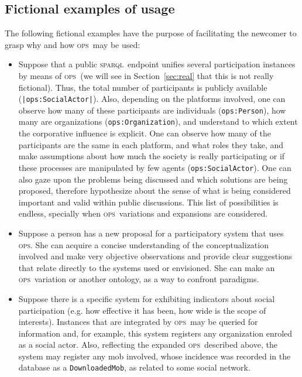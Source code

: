 \documentclass[10pt,letterpaper]{article}
\newcommand{\ops}{\textsc{ops}}
\newcommand{\sparql}{\textsc{sparql}}
\begin{document}
\subsection{Fictional examples of usage}\label{examplesUsage}
The following fictional examples 
have the purpose of facilitating the newcomer to grasp why and how \ops\ may be used:
\begin{itemize}
    \item Suppose that a public \sparql\ endpoint unifies several participation instances by means of \ops\ 
    (we will see in Section~\ref{sec:real} that this is not really fictional).
    Thus, the total number of participants is publicly available ({\tt |ops:SocialActor|}).
    Also, depending on the platforms involved,
    one can observe how many of these participants are individuals ({\tt ops:Person}), 
    how many are organizations ({\tt ops:Organization}),
    and understand to which extent the corporative influence is explicit.
    One can observe how many of the participants are the same in each platform,
    and what roles they take,
    and make assumptions about how much the society is really participating
    or if these processes are manipulated by few agents ({\tt ops:SocialActor}).
    One can also gaze upon the problems being discussed and which solutions are being proposed,
    therefore hypothesize about the sense of what is being considered important and valid within public discussions.
    This list of possibilities is endless, specially when \ops\ variations and expansions are considered.
    \item Suppose a person has a new proposal for a participatory system that uses \ops.
    She can acquire a concise understanding of the conceptualization involved
    and make very objective observations and provide clear suggestions
    that relate directly to the systems used or envisioned.
    She can make an \ops\ variation or another ontology, as a way to confront paradigms.
    \item Suppose there is a specific system for exhibiting indicators about social participation 
    (e.g. how effective it has been, how wide is the scope of interests).
    Instances that are integrated by \ops\ may be queried for information and,
    for example, this system registers any organization enroled as a social actor.
    Also, reflecting the expanded \ops\ described above, the system may register any mob involved,
    whose incidence was recorded in the database as a \texttt{DownloadedMob},
    as related to some social network.
\end{itemize}
\end{document}
